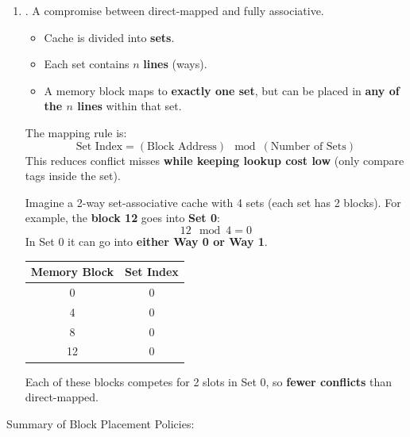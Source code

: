 \begin{enumerate}
    \item \label{def: n-way set-associative cache} . A compromise between direct-mapped and fully associative.
    \begin{itemize}
        \item Cache is divided into \textbf{sets}.
        \item Each set contains $n$ \textbf{lines} (ways).
        \item A memory block maps to \textbf{exactly one set}, but can be placed in \textbf{any of the $n$ lines} within that set.
    \end{itemize}
    The mapping rule is:
    \begin{equation}
        \text{Set Index} = \left(\text{Block Address}\right) \mod \left(\text{Number of Sets}\right)
    \end{equation}
    This reduces conflict misses \textbf{while keeping lookup cost low} (only compare tags inside the set).

    \begin{examplebox}
        Imagine a 2-way set-associative cache with 4 sets (each set has 2 blocks). For example, the \textbf{block 12} goes into \textbf{Set 0}:
        \begin{equation*}
            12 \mod 4 = 0
        \end{equation*}
        In Set 0 it can go into \textbf{either Way 0 or Way 1}.
        \begin{center}
            \begin{tabular}{@{} c | c @{}}
                \toprule
                Memory Block & Set Index \\
                \midrule
                0   & 0 \\
                4   & 0 \\
                8   & 0 \\
                12  & 0 \\
                \bottomrule
            \end{tabular}
        \end{center}
        Each of these blocks competes for 2 slots in Set 0, so \textbf{fewer conflicts} than direct-mapped.
    \end{examplebox}
\end{enumerate}
Summary of Block Placement Policies:
